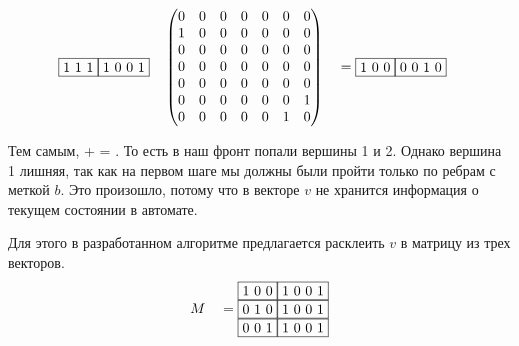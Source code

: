 \begin{example}
  \begin{alignat*}{7}
    & \begin{matrix}
      \fbox{1 1 1} \fbox{1 0 0 1}
      \end{matrix}  && \begin{pmatrix}
        0 & 0 & 0 & 0 & 0 & 0 & 0 \\
        1 & 0 & 0 & 0 & 0 & 0 & 0 \\
        0 & 0 & 0 & 0 & 0 & 0 & 0 \\
        0 & 0 & 0 & 0 & 0 & 0 & 0 \\
        0 & 0 & 0 & 0 & 0 & 0 & 0 \\
        0 & 0 & 0 & 0 & 0 & 0 & 1 \\
        0 & 0 & 0 & 0 & 0 & 1 & 0 
        \end{pmatrix} &&= \begin{matrix}
          \fbox{1 0 0} \fbox{0 0 1 0}
          \end{matrix}
    \end{alignat*}

    Тем самым,   +   =  . То есть в наш фронт  попали вершины 1 и 2.
    Однако вершина 1 лишняя, так как на первом шаге мы должны были пройти только по ребрам с меткой $b$. Это произошло, потому что в векторе $v$ не хранится информация о текущем состоянии в автомате.

    Для этого в разработанном алгоритме предлагается расклеить $v$ в матрицу из трех векторов.
    \begin{alignat*}{7}
      & &&M &&=\begin{matrix}
        \fbox{1 0 0} \fbox{1 0 0 1} \\ 
        \fbox{0 1 0} \fbox{1 0 0 1} \\
        \fbox{0 0 1} \fbox{1 0 0 1}
            \end{matrix}
      \end{alignat*}


\end{example}
